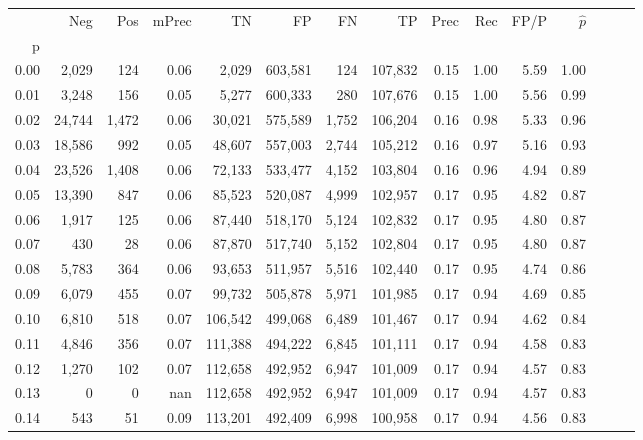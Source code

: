 \begin{tabular}{rrrrrrrrrrrrrrr}
\toprule
{} &     Neg &    Pos & mPrec &       TN &       FP &       FN &       TP &  Prec &   Rec &  FP/P & $\hat{p}$ \\
p    &         &        &       &          &          &          &          &       &       &       &           \\
\midrule
0.00 &   2,029 &    124 &  0.06 &    2,029 &  603,581 &      124 &  107,832 &  0.15 &  1.00 &  5.59 &      1.00 \\
0.01 &   3,248 &    156 &  0.05 &    5,277 &  600,333 &      280 &  107,676 &  0.15 &  1.00 &  5.56 &      0.99 \\
0.02 &  24,744 &  1,472 &  0.06 &   30,021 &  575,589 &    1,752 &  106,204 &  0.16 &  0.98 &  5.33 &      0.96 \\
0.03 &  18,586 &    992 &  0.05 &   48,607 &  557,003 &    2,744 &  105,212 &  0.16 &  0.97 &  5.16 &      0.93 \\
0.04 &  23,526 &  1,408 &  0.06 &   72,133 &  533,477 &    4,152 &  103,804 &  0.16 &  0.96 &  4.94 &      0.89 \\
0.05 &  13,390 &    847 &  0.06 &   85,523 &  520,087 &    4,999 &  102,957 &  0.17 &  0.95 &  4.82 &      0.87 \\
0.06 &   1,917 &    125 &  0.06 &   87,440 &  518,170 &    5,124 &  102,832 &  0.17 &  0.95 &  4.80 &      0.87 \\
0.07 &     430 &     28 &  0.06 &   87,870 &  517,740 &    5,152 &  102,804 &  0.17 &  0.95 &  4.80 &      0.87 \\
0.08 &   5,783 &    364 &  0.06 &   93,653 &  511,957 &    5,516 &  102,440 &  0.17 &  0.95 &  4.74 &      0.86 \\
0.09 &   6,079 &    455 &  0.07 &   99,732 &  505,878 &    5,971 &  101,985 &  0.17 &  0.94 &  4.69 &      0.85 \\
0.10 &   6,810 &    518 &  0.07 &  106,542 &  499,068 &    6,489 &  101,467 &  0.17 &  0.94 &  4.62 &      0.84 \\
0.11 &   4,846 &    356 &  0.07 &  111,388 &  494,222 &    6,845 &  101,111 &  0.17 &  0.94 &  4.58 &      0.83 \\
0.12 &   1,270 &    102 &  0.07 &  112,658 &  492,952 &    6,947 &  101,009 &  0.17 &  0.94 &  4.57 &      0.83 \\
0.13 &       0 &      0 &   nan &  112,658 &  492,952 &    6,947 &  101,009 &  0.17 &  0.94 &  4.57 &      0.83 \\
0.14 &     543 &     51 &  0.09 &  113,201 &  492,409 &    6,998 &  100,958 &  0.17 &  0.94 &  4.56 &      0.83 \\

\end{tabular}
